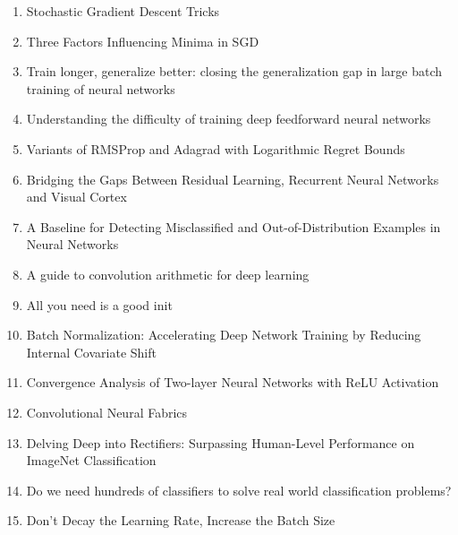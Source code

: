 \documentclass[acmlarge]{acmart}
\begin{document}
\begin{enumerate}
	\item Stochastic Gradient Descent Tricks \cite{Bottou2012StochasticGD} 

	\item Three Factors Influencing Minima in SGD \cite{Jastrzebski2017ThreeFI} 

	\item Train longer, generalize better: closing the generalization gap in large batch training of neural networks \cite{Hoffer2017TrainLG} 

	\item Understanding the difficulty of training deep feedforward neural networks \cite{Glorot2010UnderstandingTD} 

	\item Variants of RMSProp and Adagrad with Logarithmic Regret Bounds \cite{Mukkamala2017VariantsOR} 

	\item Bridging the Gaps Between Residual Learning, Recurrent Neural Networks and Visual Cortex \cite{Liao2016BridgingTG} 

	\item A Baseline for Detecting Misclassified and Out-of-Distribution Examples in Neural Networks \cite{Hendrycks2017ABF} 

	\item A guide to convolution arithmetic for deep learning \cite{Dumoulin2016AGT} 

	\item All you need is a good init \cite{Mishkin2016AllYN} 

	\item Batch Normalization: Accelerating Deep Network Training by Reducing Internal Covariate Shift \cite{Ioffe2015BatchNA} 

	\item Convergence Analysis of Two-layer Neural Networks with ReLU Activation \cite{Li2017ConvergenceAO} 

	\item Convolutional Neural Fabrics \cite{Saxena2016ConvolutionalNF} 

	\item Delving Deep into Rectifiers: Surpassing Human-Level Performance on ImageNet Classification \cite{He2015DelvingDI} 

	\item Do we need hundreds of classifiers to solve real world classification problems? \cite{Delgado2014DoWN} 

	\item Don't Decay the Learning Rate, Increase the Batch Size \cite{Smith2018DontDT} 


\end{enumerate}
\end{document}
